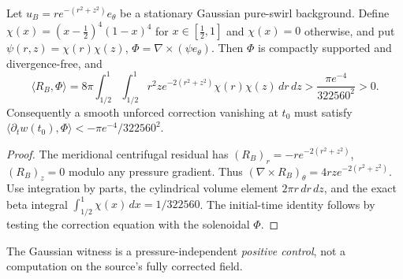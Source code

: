 \begin{proposition}
Let $u_B=r e^{-(r^2+z^2)}e_\theta$ be a stationary Gaussian
pure-swirl background. Define
$\chi(x)=(x-\frac12)^4(1-x)^4$ for $x\in[\frac12,1]$ and
$\chi(x)=0$ otherwise, and put
$\psi(r,z)=\chi(r)\chi(z)$, $\Phi=\nabla\times(\psi e_\theta)$.
Then $\Phi$ is compactly supported and divergence-free, and
\[
\langle R_B,\Phi\rangle
=8\pi\int_{1/2}^1\!\int_{1/2}^1
r^2 z e^{-2(r^2+z^2)}\chi(r)\chi(z)\,dr\,dz
>\frac{\pi e^{-4}}{322560^2}>0.
\]
Consequently a smooth unforced correction vanishing at $t_0$
must satisfy
$\langle\partial_t w(t_0),\Phi\rangle
<-\pi e^{-4}/322560^2$.
\end{proposition}
\begin{proof}
The meridional centrifugal residual has
$(R_B)_r=-r e^{-2(r^2+z^2)}$, $(R_B)_z=0$
modulo any pressure gradient. Thus
$(\nabla\times R_B)_\theta=4rz e^{-2(r^2+z^2)}$.
Use integration by parts, the cylindrical volume element
$2\pi r\,dr\,dz$, and the exact beta integral
$\int_{1/2}^1\chi(x)\,dx=1/322560$.
The initial-time identity follows by testing the correction equation
with the solenoidal $\Phi$.
\end{proof}
The Gaussian witness is a pressure-independent \emph{positive control},
not a computation on the source's fully corrected field.
